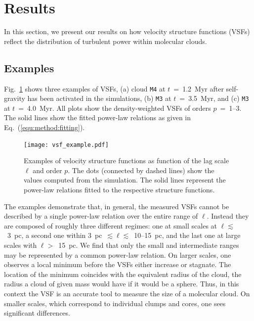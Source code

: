 \section{Results}\label{results}

In this section, we present our results on how velocity structure functions (VSFs) reflect the distribution of turbulent power within molecular clouds.

\subsection{Examples}
Fig.~\ref{pic:results:vsf_example} shows three examples of VSFs, (a) cloud \texttt{M4} at $t$~=~1.2~Myr after self-gravity has been activated in the simulations, (b) \texttt{M3} at $t$~=~3.5~Myr, and (c) \texttt{M3} at $t$~=~4.0~Myr.
All plots show the
    density-weighted 
VSFs of orders $p$~=~1--3.
The solid lines show the fitted power-law relations as given in Eq.~(\ref{equ:method:fitting}).

\begin{figure}[!htb]
	\centering
	\texttt{[image: vsf\_example.pdf]}
    \caption{Examples of velocity structure functions as function of the lag scale $\ell$ and order $p$. 
    	The dots (connected by dashed lines) 
    show the values computed from the simulation.
        The solid lines represent the power-law relations fitted to the respective structure functions.
	}
    \label{pic:results:vsf_example}
\end{figure}

The examples demonstrate that, in general, the measured VSFs cannot be described by a single power-law relation over the entire range of $\ell$.
Instead they are composed of roughly three different regimes: 
one at small scales at $\ell \lesssim$~3~pc, a second one within 3~pc~$\lesssim \ell \lesssim$~10--15~pc, and the last one at large scales with $\ell >$~15~pc.
    We find that
only the small and intermediate ranges may be represented by a common power-law relation.
On larger scales, one observes a local minimum before the VSFs either increase or stagnate.
The location of the minimum coincides with the equivalent radius of the cloud, the radius a cloud of given mass would have if it would be a sphere.
Thus, in this context the VSF is an accurate tool to measure the size of a molecular cloud.
On smaller scales, which correspond to individual clumps and cores, one sees significant differences.

